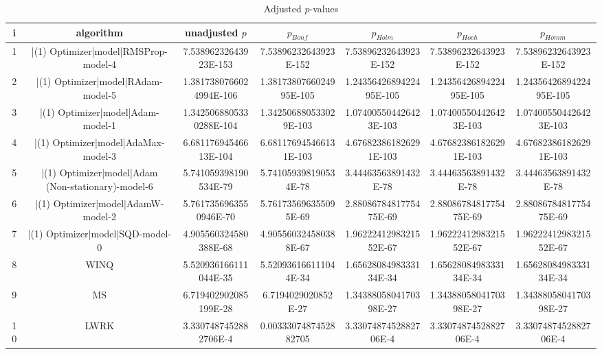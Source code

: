 \documentclass[a3paper,10pt]{article}
\begin{document}
\begin{table}[!htp]
\centering\tiny
\caption{Adjusted $p$-values}
\begin{tabular}{ccccccc}
i&algorithm&unadjusted $p$&$p_{Bonf}$&$p_{Holm}$&$p_{Hoch}$&$p_{Homm}$\\
\hline
1&|(1) Optimizer|model|RMSProp-model-4&7.53896232643923E-153&7.53896232643923E-152&7.53896232643923E-152&7.53896232643923E-152&7.53896232643923E-152\\
2&|(1) Optimizer|model|RAdam-model-5&1.3817380766024994E-106&1.3817380766024995E-105&1.2435642689422495E-105&1.2435642689422495E-105&1.2435642689422495E-105\\
3&|(1) Optimizer|model|Adam-model-1&1.3425068805330288E-104&1.342506880533029E-103&1.074005504426423E-103&1.074005504426423E-103&1.074005504426423E-103\\
4&|(1) Optimizer|model|AdaMax-model-3&6.68117694546613E-104&6.681176945466131E-103&4.676823861826291E-103&4.676823861826291E-103&4.676823861826291E-103\\
5&|(1) Optimizer|model|Adam (Non-stationary)-model-6&5.741059398190534E-79&5.741059398190534E-78&3.44463563891432E-78&3.44463563891432E-78&3.44463563891432E-78\\
6&|(1) Optimizer|model|AdamW-model-2&5.7617356963550946E-70&5.761735696355095E-69&2.8808678481775475E-69&2.8808678481775475E-69&2.8808678481775475E-69\\
7&|(1) Optimizer|model|SQD-model-0&4.905560324580388E-68&4.905560324580388E-67&1.9622241298321552E-67&1.9622241298321552E-67&1.9622241298321552E-67\\
8&WINQ&5.520936166111044E-35&5.520936166111044E-34&1.6562808498333134E-34&1.6562808498333134E-34&1.6562808498333134E-34\\
9&MS&6.719402902085199E-28&6.7194029020852E-27&1.3438805804170398E-27&1.3438805804170398E-27&1.3438805804170398E-27\\
10&LWRK&3.3307487452882706E-4&0.0033307487452882705&3.3307487452882706E-4&3.3307487452882706E-4&3.3307487452882706E-4\\
\hline
\end{tabular}
\end{table}
\end{document}
